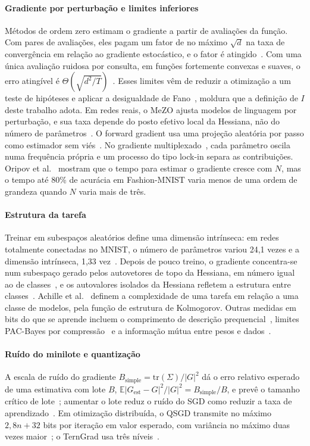 \documentclass[journal]{IEEEtran}
\begin{document}
\paragraph*{Gradiente por perturbação e limites inferiores} Métodos de ordem zero estimam o gradiente a partir de avaliações da função. Com pares de avaliações, eles pagam um fator de no máximo $\sqrt d$ na taxa de convergência em relação ao gradiente estocástico, e o fator é atingido~\cite{duchi2015}. Com uma única avaliação ruidosa por consulta, em funções fortemente convexas e suaves, o erro atingível é $\Theta(\sqrt{d^2/T})$~\cite{shamir2013}. Esses limites vêm de reduzir a otimização a um teste de hipóteses e aplicar a desigualdade de Fano~\cite{agarwal2012}, moldura que a definição de $I$ deste trabalho adota. Em redes reais, o MeZO ajusta modelos de linguagem por perturbação, e sua taxa depende do posto efetivo local da Hessiana, não do número de parâmetros~\cite{malladi2023}. O forward gradient usa uma projeção aleatória por passo como estimador sem viés~\cite{baydin2022}. No gradiente multiplexado~\cite{mccaughan2023}, cada parâmetro oscila numa frequência própria e um processo do tipo lock-in separa as contribuições. Oripov et al.~\cite{oripov2025} mostram que o tempo para estimar o gradiente cresce com $N$, mas o tempo até 80\% de acurácia em Fashion-MNIST varia menos de uma ordem de grandeza quando $N$ varia mais de três.

\paragraph*{Estrutura da tarefa} Treinar em subespaços aleatórios define uma dimensão intrínseca: em redes totalmente conectadas no MNIST, o número de parâmetros variou 24,1 vezes e a dimensão intrínseca, 1,33 vez~\cite{li2018}. Depois de pouco treino, o gradiente concentra-se num subespaço gerado pelos autovetores de topo da Hessiana, em número igual ao de classes~\cite{gurari2018}, e os autovalores isolados da Hessiana refletem a estrutura entre classes~\cite{papyan2020}. Achille et al.~\cite{achille2019} definem a complexidade de uma tarefa em relação a uma classe de modelos, pela função de estrutura de Kolmogorov. Outras medidas em bits do que se aprende incluem o comprimento de descrição prequencial~\cite{blier2018}, limites PAC-Bayes por compressão~\cite{lotfi2022} e a informação mútua entre pesos e dados~\cite{xu2017}.

\paragraph*{Ruído do minilote e quantização} A escala de ruído do gradiente $B_{\text{simple}} = \mathrm{tr}(\Sigma)/|G|^2$ dá o erro relativo esperado de uma estimativa com lote $B$, $\mathbb{E}|G_{\text{est}}-G|^2/|G|^2 = B_{\text{simple}}/B$, e prevê o tamanho crítico de lote~\cite{mccandlish2018}; aumentar o lote reduz o ruído do SGD como reduzir a taxa de aprendizado~\cite{smith2018}. Em otimização distribuída, o QSGD transmite no máximo $2{,}8n + 32$ bits por iteração em valor esperado, com variância no máximo duas vezes maior~\cite{alistarh2017}; o TernGrad usa três níveis~\cite{wen2017}.
\end{document}
